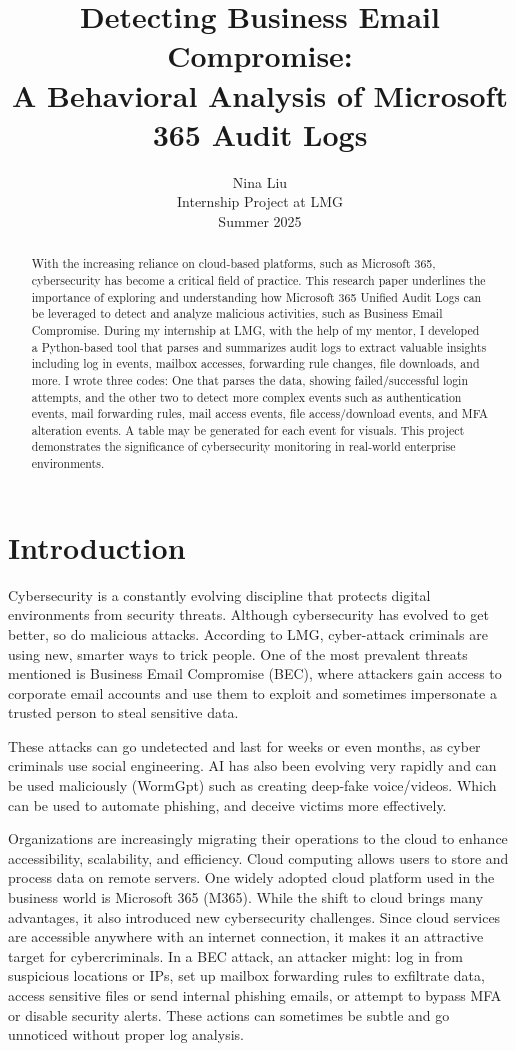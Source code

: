 \documentclass[12pt]{article}
\title{\bf Detecting Business Email Compromise:\\ A Behavioral Analysis of Microsoft 365 Audit Logs}
\author{Nina Liu \\ Internship Project at LMG \\ Summer 2025}
\date{}
\begin{document}
\maketitle

\begin{abstract}
With the increasing reliance on cloud-based platforms, such as Microsoft 365, cybersecurity has become a critical field of practice. This research paper underlines the importance of exploring and understanding how Microsoft 365 Unified Audit Logs can be leveraged to detect and analyze malicious activities, such as Business Email Compromise. During my internship at LMG, with the help of my mentor, I developed a Python-based tool that parses and summarizes audit logs to extract valuable insights including log in events, mailbox accesses, forwarding rule changes, file downloads, and more. I wrote three codes: One that parses the data, showing failed/successful login attempts, and the other two to detect more complex events such as authentication events, mail forwarding rules, mail access events, file access/download events, and MFA alteration events. A table may be generated for each event for visuals. This project demonstrates the significance of cybersecurity monitoring in real-world enterprise environments. 
\end{abstract}

\section{Introduction}

Cybersecurity is a constantly evolving discipline that protects digital environments from security threats. Although cybersecurity has evolved to get better, so do malicious attacks. According to LMG, cyber-attack criminals are using new, smarter ways to trick people. One of the most prevalent threats mentioned is Business Email Compromise (BEC), where attackers gain access to corporate email accounts and use them to exploit and sometimes impersonate a trusted person to steal sensitive data. 

These attacks can go undetected and last for weeks or even months, as cyber criminals use social engineering. AI has also been evolving very rapidly and can be used maliciously (WormGpt) such as creating deep-fake voice/videos. Which can be used to automate phishing, and deceive victims more effectively.

Organizations are increasingly migrating their operations to the cloud to enhance accessibility, scalability, and efficiency. Cloud computing allows users to store and process data on remote servers. One widely adopted cloud platform used in the business world is Microsoft 365 (M365). While the shift to cloud brings many advantages, it also introduced new cybersecurity challenges. Since cloud services are accessible anywhere with an internet connection, it makes it an attractive target for cybercriminals. In a BEC attack, an attacker might: log in from suspicious locations or IPs, set up mailbox forwarding rules to exfiltrate data, access sensitive files or send internal phishing emails, or attempt to bypass MFA or disable security alerts. These actions can sometimes be subtle and go unnoticed without proper log analysis.
\end{document}
